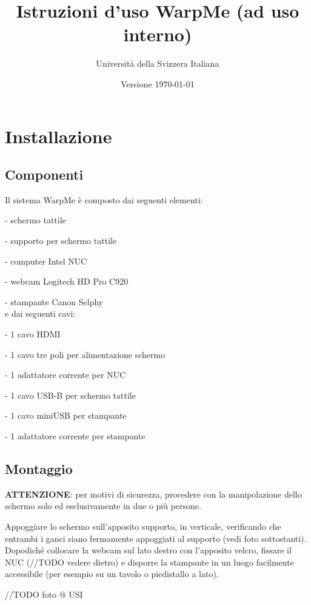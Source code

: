 \documentclass[12pt]{article}
\title{Istruzioni d'uso WarpMe (ad uso interno)}
\author{Università della Svizzera Italiana}
\date{Versione \today}
\begin{document}
\maketitle
\tableofcontents
\newpage


\section{Installazione}\label{installation}	

	\subsection{Componenti}
	
		Il sistema WarpMe è composto dai seguenti elementi:
		
		- schermo tattile
		
		- supporto per schermo tattile
		
		- computer Intel NUC
		
		- webcam Logitech HD Pro C920
		
		- stampante Canon Selphy\\
		
		e dai seguenti cavi:
		
		- 1 cavo HDMI
		
		- 1 cavo tre poli per alimentazione schermo
		
		- 1 adattatore corrente per NUC
		
		- 1 cavo USB-B per schermo tattile
		
		- 1 cavo miniUSB per stampante
		
		- 1 adattatore corrente per stampante
		
		
	\subsection{Montaggio}
	
		\textbf{ATTENZIONE}: per motivi di sicurezza, procedere con la manipolazione dello schermo solo ed esclusivamente in due o più persone.
		
		Appoggiare lo schermo sull'apposito supporto, in verticale, verificando che entrambi i ganci siano fermamente appoggiati al supporto (vedi foto sottostanti). Dopodiché collocare la webcam sul lato destro con l'apposito velcro, fissare il NUC (//TODO vedere dietro) e disporre la stampante in un luogo facilmente accessibile (per esempio su un tavolo o piedistallo a lato).
	
		//TODO foto @ USI
		
\end{document}
